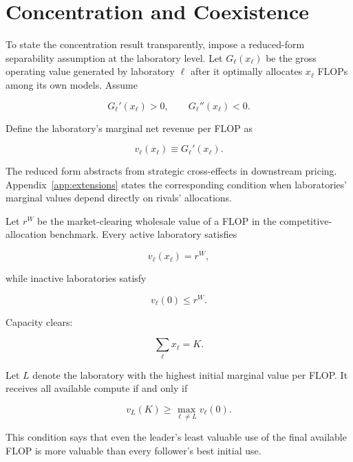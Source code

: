 \documentclass[11pt]{article}
\begin{document}
\section{Concentration and Coexistence}
\label{sec:concentration}

To state the concentration result transparently, impose a reduced-form separability assumption at the laboratory level. Let $G_\ell(x_\ell)$ be the gross operating value generated by laboratory $\ell$ after it optimally allocates $x_\ell$ FLOPs among its own models. Assume

\begin{equation}G_\ell'(x_\ell)>0,\qquad G_\ell''(x_\ell)<0.\end{equation}

Define the laboratory's marginal net revenue per FLOP as

\begin{equation}v_\ell(x_\ell)\equiv G_\ell'(x_\ell).\end{equation}

The reduced form abstracts from strategic cross-effects in downstream pricing. Appendix~\ref{app:extensions} states the corresponding condition when laboratories' marginal values depend directly on rivals' allocations.

Let $r^W$ be the market-clearing wholesale value of a FLOP in the competitive-allocation benchmark. Every active laboratory satisfies

\begin{equation}v_\ell(x_\ell)=r^W,\end{equation}

while inactive laboratories satisfy

\begin{equation}v_\ell(0)\leq r^W.\end{equation}

Capacity clears:

\begin{equation}\sum_\ell x_\ell=K.\end{equation}

Let $L$ denote the laboratory with the highest initial marginal value per FLOP. It receives all available compute if and only if

\begin{equation}\boxed{v_L(K)\geq\max_{\ell\neq L}v_\ell(0).}\end{equation}

This condition says that even the leader's least valuable use of the final available FLOP is more valuable than every follower's best initial use.
\end{document}

